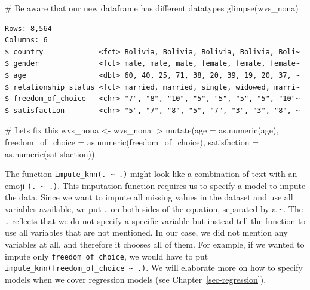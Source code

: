 \documentclass[
  letterpaper,
]{krantz}
\makeatletter
\newenvironment{Shaded}{\begin{snugshade}}{\end{snugshade}}
\newcommand{\AttributeTok}[1]{\textcolor[rgb]{0.40,0.45,0.13}{#1}}
\newcommand{\CommentTok}[1]{\textcolor[rgb]{0.37,0.37,0.37}{#1}}
\newcommand{\FunctionTok}[1]{\textcolor[rgb]{0.28,0.35,0.67}{#1}}
\newcommand{\NormalTok}[1]{\textcolor[rgb]{0.00,0.23,0.31}{#1}}
\newcommand{\OtherTok}[1]{\textcolor[rgb]{0.00,0.23,0.31}{#1}}
\newcommand{\SpecialCharTok}[1]{\textcolor[rgb]{0.37,0.37,0.37}{#1}}
\newenvironment{kframe}{%
\medskip{}
\setlength{\fboxsep}{.8em}
 \def\at@end@of@kframe{}%
 \ifinner\ifhmode%
  \def\at@end@of@kframe{\end{minipage}}%
  \begin{minipage}{\columnwidth}%
 \fi\fi%
 \def\FrameCommand##1{\hskip\@totalleftmargin \hskip-\fboxsep
 \colorbox{shadecolor}{##1}\hskip-\fboxsep
     \hskip-\linewidth \hskip-\@totalleftmargin \hskip\columnwidth}%
 \MakeFramed {\advance\hsize-\width
   \@totalleftmargin\z@ \linewidth\hsize
   \@setminipage}}%
 {\par\unskip\endMakeFramed%
 \at@end@of@kframe}
\renewenvironment{Shaded}{\begin{kframe}}{\end{kframe}}
\makeatother
\begin{document}
\begin{Shaded}
\begin{Highlighting}[]
\CommentTok{\# Be aware that our new dataframe has different datatypes}
\FunctionTok{glimpse}\NormalTok{(wvs\_nona)}
\end{Highlighting}
\end{Shaded}

\begin{verbatim}
Rows: 8,564
Columns: 6
$ country             <fct> Bolivia, Bolivia, Bolivia, Bolivia, Boli~
$ gender              <fct> male, male, male, female, female, female~
$ age                 <dbl> 60, 40, 25, 71, 38, 20, 39, 19, 20, 37, ~
$ relationship_status <fct> married, married, single, widowed, marri~
$ freedom_of_choice   <chr> "7", "8", "10", "5", "5", "5", "5", "10"~
$ satisfaction        <chr> "5", "7", "8", "5", "7", "3", "3", "8", ~
\end{verbatim}

\begin{Shaded}
\begin{Highlighting}[]
\CommentTok{\# Let\textquotesingle{}s fix this}
\NormalTok{wvs\_nona }\OtherTok{\textless{}{-}}
\NormalTok{  wvs\_nona }\SpecialCharTok{|\textgreater{}}
  \FunctionTok{mutate}\NormalTok{(}\AttributeTok{age =} \FunctionTok{as.numeric}\NormalTok{(age),}
         \AttributeTok{freedom\_of\_choice =} \FunctionTok{as.numeric}\NormalTok{(freedom\_of\_choice),}
         \AttributeTok{satisfaction =} \FunctionTok{as.numeric}\NormalTok{(satisfaction))}
\end{Highlighting}
\end{Shaded}

The function \texttt{impute\_knn(.\ \textasciitilde{}\ .)} might look
like a combination of text with an emoji
\texttt{(.\ \textasciitilde{}\ .)}. This imputation function requires us
to specify a model to impute the data. Since we want to impute all
missing values in the dataset and use all variables available, we put
\texttt{.} on both sides of the equation, separated by a
\texttt{\textasciitilde{}}. The \texttt{.} reflects that we do not
specify a specific variable but instead tell the function to use all
variables that are not mentioned. In our case, we did not mention any
variables at all, and therefore it chooses all of them. For example, if
we wanted to impute only \texttt{freedom\_of\_choice}, we would have to
put \texttt{impute\_knn(freedom\_of\_choice\ \textasciitilde{}\ .)}. We
will elaborate more on how to specify models when we cover regression
models (see Chapter~\ref{sec-regression}).
\end{document}
